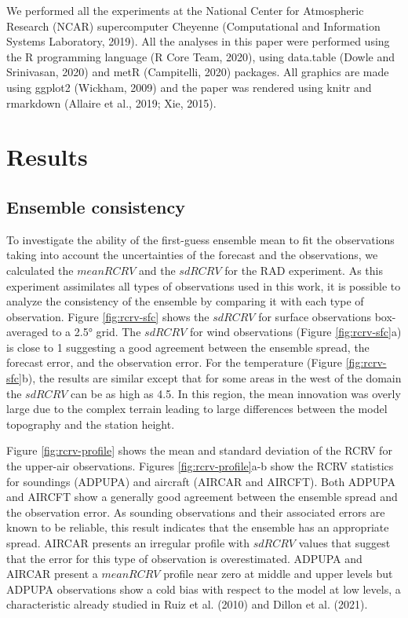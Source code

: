 \documentclass[authoryear,preprint,review,12pt]{elsarticle} %
\begin{document}
We performed all the experiments at the National Center for Atmospheric Research (NCAR) supercomputer Cheyenne (Computational and Information Systems Laboratory, 2019). All the analyses in this paper were performed using the R programming language (R Core Team, 2020), using data.table (Dowle and Srinivasan, 2020) and metR (Campitelli, 2020) packages.
All graphics are made using ggplot2 (Wickham, 2009) and the paper was rendered using knitr and rmarkdown (Allaire et al., 2019; Xie, 2015).

\hypertarget{results}{%
\section{Results}\label{results}}

\hypertarget{ensemble-consistency}{%
\subsection{Ensemble consistency}\label{ensemble-consistency}}

To investigate the ability of the first-guess ensemble mean to fit the observations taking into account the uncertainties of the forecast and the observations, we calculated the \(mean RCRV\) and the \(sd RCRV\) for the RAD experiment. As this experiment assimilates all types of observations used in this work, it is possible to analyze the consistency of the ensemble by comparing it with each type of observation. Figure \ref{fig:rcrv-sfc} shows the \(sd RCRV\) for surface observations box-averaged to a 2.5° grid. The \(sd RCRV\) for wind observations (Figure \ref{fig:rcrv-sfc}a) is close to 1 suggesting a good agreement between the ensemble spread, the forecast error, and the observation error. For the temperature (Figure \ref{fig:rcrv-sfc}b), the results are similar except that for some areas in the west of the domain the \(sd RCRV\) can be as high as 4.5. In this region, the mean innovation was overly large due to the complex terrain leading to large differences between the model topography and the station height.

Figure \ref{fig:rcrv-profile} shows the mean and standard deviation of the RCRV for the upper-air observations. Figures \ref{fig:rcrv-profile}a-b show the RCRV statistics for soundings (ADPUPA) and aircraft (AIRCAR and AIRCFT). Both ADPUPA and AIRCFT show a generally good agreement between the ensemble spread and the observation error. As sounding observations and their associated errors are known to be reliable, this result indicates that the ensemble has an appropriate spread. AIRCAR presents an irregular profile with \(sd RCRV\) values that suggest that the error for this type of observation is overestimated. ADPUPA and AIRCAR present a \(mean RCRV\) profile near zero at middle and upper levels but ADPUPA observations show a cold bias with respect to the model at low levels, a characteristic already studied in Ruiz et al. (2010) and Dillon et al. (2021).
\end{document}
